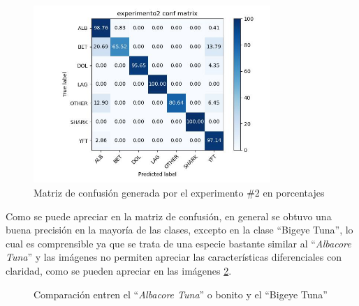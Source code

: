\begin{figure}[h!]
\centering
\includegraphics[width=0.8\textwidth]{images/experimento2_conf_matrix.jpg}
\caption{Matriz de confusión generada por el experimento \#2 en porcentajes}
\label{fig:Matrix2}
\end{figure}

Como se puede apreciar en la matriz de confusión, en general se obtuvo una buena precisión en la mayoría de las clases, excepto en la clase ``Bigeye Tuna'', lo cual es comprensible ya que se trata de una especie bastante similar al ``\textit{Albacore Tuna}'' y las imágenes no permiten apreciar las características diferenciales con claridad, como se pueden apreciar en las imágenes \ref{fig:combined2}.

\begin{figure}[h!]%
    \centering
    \qquad
    \caption{Comparación entren el ``\textit{Albacore Tuna}'' o bonito y el ``Bigeye Tuna''}%
    \label{fig:combined2}%
\end{figure}

